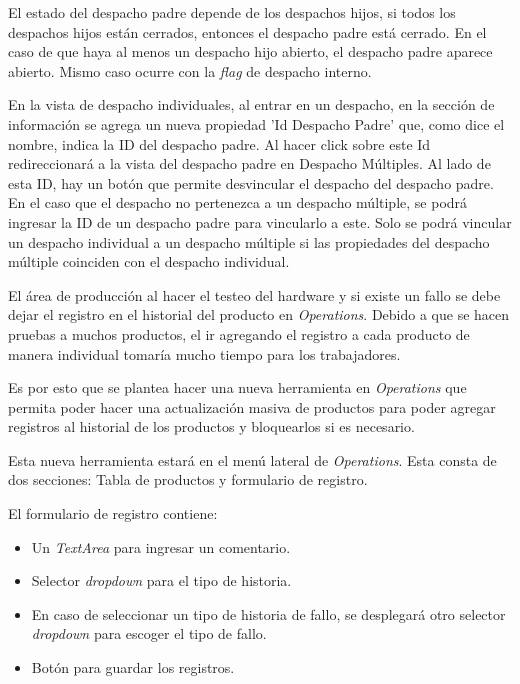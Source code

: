 El estado del despacho padre depende de los despachos hijos, si todos los despachos hijos están cerrados, entonces el despacho padre está cerrado. En el caso de que haya al menos un despacho hijo abierto, el despacho padre aparece abierto. Mismo caso ocurre con la \textit{flag} de despacho interno.

En la vista de despacho individuales, al entrar en un despacho, en la sección de información se agrega un nueva propiedad 'Id Despacho Padre' que, como dice el nombre, indica la ID del despacho padre. Al hacer click sobre este Id redireccionará a la vista del despacho padre en Despacho Múltiples.
Al lado de esta ID, hay un botón que permite desvincular el despacho del despacho padre. 
En el caso que el despacho no pertenezca a un despacho múltiple, se podrá ingresar la ID de un despacho padre para vincularlo a este. Solo se podrá vincular un despacho individual a un despacho múltiple si las propiedades del despacho múltiple coinciden con el despacho individual.


El área de producción al hacer el testeo del hardware y si existe un fallo se debe dejar el registro en el historial del producto en \textit{Operations}.
Debido a que se hacen pruebas a muchos productos, el ir agregando el registro a cada producto de manera individual tomaría mucho tiempo para los trabajadores.

Es por esto que se plantea hacer una nueva herramienta en \textit{Operations} que permita poder hacer una actualización masiva de productos para poder agregar registros al historial de los productos y bloquearlos si es necesario.

Esta nueva herramienta estará en el menú lateral de \textit{Operations}. Esta consta de dos secciones: Tabla de productos y formulario de registro.

El formulario de registro contiene:
\begin{itemize}
    \item Un \textit{TextArea} para ingresar un comentario.
    \item Selector \textit{dropdown} para el tipo de historia.
    \item En caso de seleccionar un tipo de historia de fallo, se desplegará otro selector \textit{dropdown} para escoger el tipo de fallo.
    \item Botón para guardar los registros.
\end{itemize}

